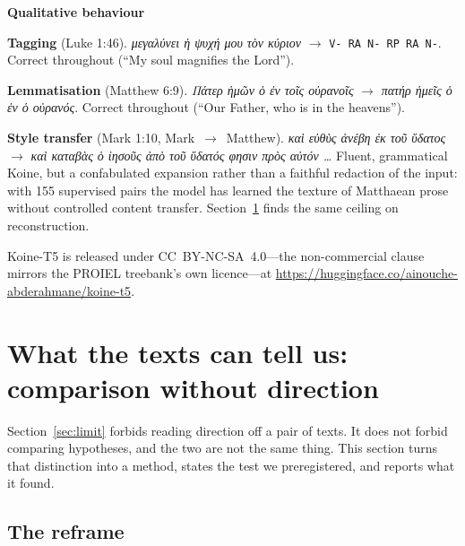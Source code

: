 \documentclass[11pt,letterpaper]{article}
\newcommand{\gk}[1]{{\greekfont\itshape #1}}
\begin{document}
\begin{tcolorbox}[enhanced, breakable, colback=papyrus, colframe=papyrus,
  boxrule=0pt, arc=0pt, outer arc=0pt,
  borderline west={2.6pt}{0pt}{marinelight}, left=15pt, right=15pt, top=9pt, bottom=9pt]
{\headfont\bfseries\color{marine}\small Qualitative behaviour}\par\vspace{4pt}\small
\textbf{Tagging} (Luke 1:46). \gk{μεγαλύνει ἡ ψυχή μου τὸν κύριον} $\rightarrow$ \texttt{V- RA N- RP RA N-}. Correct throughout (``My soul magnifies the Lord'').\par\vspace{3pt}
\textbf{Lemmatisation} (Matthew 6:9). \gk{Πάτερ ἡμῶν ὁ ἐν τοῖς οὐρανοῖς} $\rightarrow$ \gk{πατήρ ἡμεῖς ὁ ἐν ὁ οὐρανός}. Correct throughout (``Our Father, who is in the heavens'').\par\vspace{3pt}
\textbf{Style transfer} (Mark 1:10, Mark~$\to$~Matthew). \gk{καὶ εὐθὺς ἀνέβη ἐκ τοῦ ὕδατος} $\rightarrow$ \gk{καὶ καταβὰς ὁ ἰησοῦς ἀπὸ τοῦ ὕδατός φησιν πρὸς αὐτόν \dots} Fluent, grammatical Koine, but a confabulated expansion rather than a faithful redaction of the input: with 155 supervised pairs the model has learned the texture of Matthaean prose without controlled content transfer. Section~\ref{sec:reframe} finds the same ceiling on reconstruction.
\end{tcolorbox}

Koine-T5 is released under CC~BY-NC-SA~4.0---the non-commercial clause mirrors the PROIEL treebank's own licence---at \url{https://huggingface.co/ainouche-abderahmane/koine-t5}.

\section{What the texts can tell us: comparison without direction}
\label{sec:reframe}

Section~\ref{sec:limit} forbids reading direction off a pair of texts. It does not forbid comparing hypotheses, and the two are not the same thing. This section turns that distinction into a method, states the test we preregistered, and reports what it found.

\subsection{The reframe}
\end{document}
